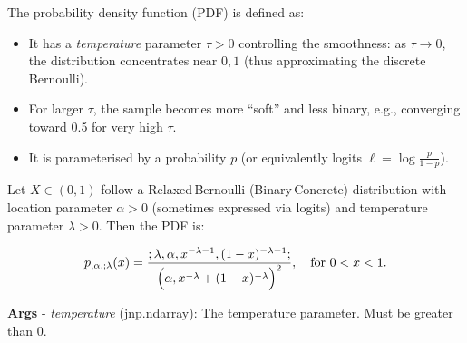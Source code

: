 \documentclass[
  letterpaper,
  DIV=11,
  numbers=noendperiod]{scrartcl}
\providecommand{\tightlist}{%
  \setlength{\itemsep}{0pt}\setlength{\parskip}{0pt}}\usepackage{longtable,booktabs,array}
\begin{document}
The probability density function (PDF) is defined as:

\begin{itemize}
\tightlist
\item
  It has a \emph{temperature} parameter \(\tau > 0\) controlling the
  smoothness: as \(\tau \to 0\), the distribution concentrates near
  \({0, 1}\) (thus approximating the discrete Bernoulli).
\item
  For larger \(\tau\), the sample becomes more ``soft'' and less binary,
  e.g., converging toward 0.5 for very high \(\tau\).
\item
  It is parameterised by a probability \(p\) (or equivalently logits
  \(\ell = \log\frac{p}{1-p}\)).
\end{itemize}

Let \(X \in (0,1)\) follow a Relaxed\,Bernoulli (Binary\,Concrete)
distribution with location parameter \(\alpha > 0\) (sometimes expressed
via logits) and temperature parameter \(\lambda > 0\). Then the PDF is:

\[
p_{,\alpha,;\lambda}(x) =
\frac{;\lambda,\alpha,x^{-\lambda - 1},(1 - x)^{-\lambda - 1};}
{\Bigl(\alpha,x^{-\lambda} + (1 - x)^{-\lambda}\Bigr)^{2}},
\quad \text{for } 0 < x < 1.
\]

\textbf{Args} - \emph{temperature} (jnp.ndarray): The temperature
parameter. Must be greater than 0.
\end{document}
